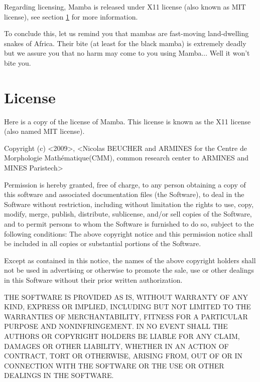 \documentclass[a4paper,10pt,oneside]{article}
\begin{document}
Regarding licensing, Mamba is released under X11 license (also known as MIT 
license), see section \ref{cha:License} for more information.

To conclude this, let us remind you that mambas are fast-moving land-dwelling 
snakes of Africa. Their bite (at least for the black mamba) is extremely deadly 
but we assure you that no harm may come to you using Mamba... Well it won't bite
you.

\pagebreak

\section{License}
\label{cha:License}

Here is a copy of the license of Mamba. This license is known as the X11 license
(also named MIT license).

\vspace{0.5cm}

\begin{minipage}[c]{0.8\textwidth}%
 {\small Copyright (c) <2009>, <Nicolas BEUCHER and ARMINES for the Centre de 
 Morphologie Math\'{e}matique(CMM), common research center to ARMINES and MINES 
 Paristech>}{\small \vspace{0.5cm} \par}

{\small Permission is hereby granted, free of charge, to any person
obtaining a copy of this software and associated documentation files
(the \textquotedbl{}Software\textquotedbl{}), to deal in the Software
without restriction, including without limitation the rights to use,
copy, modify, merge, publish, distribute, sublicense, and/or sell
copies of the Software, and to permit persons to whom the Software
is furnished to do so, subject to the following conditions: The above
copyright notice and this permission notice shall be included in all
copies or substantial portions of the Software.}{\small \vspace{0.5cm} \par}

{\small Except as contained in this notice, the names of the above copyright 
holders shall not be used in advertising or otherwise to promote the sale, use 
or other dealings in this Software without their prior written authorization.}
{\small \vspace{0.5cm} \par}

{\small THE SOFTWARE IS PROVIDED \textquotedbl{}AS IS\textquotedbl{},
WITHOUT WARRANTY OF ANY KIND, EXPRESS OR IMPLIED, INCLUDING BUT NOT
LIMITED TO THE WARRANTIES OF MERCHANTABILITY, FITNESS FOR A PARTICULAR
PURPOSE AND NONINFRINGEMENT. IN NO EVENT SHALL THE AUTHORS OR COPYRIGHT
HOLDERS BE LIABLE FOR ANY CLAIM, DAMAGES OR OTHER LIABILITY, WHETHER
IN AN ACTION OF CONTRACT, TORT OR OTHERWISE, ARISING FROM, OUT OF
OR IN CONNECTION WITH THE SOFTWARE OR THE USE OR OTHER DEALINGS IN
THE SOFTWARE. }%
\vspace{1cm}
\end{minipage}
\end{document}

